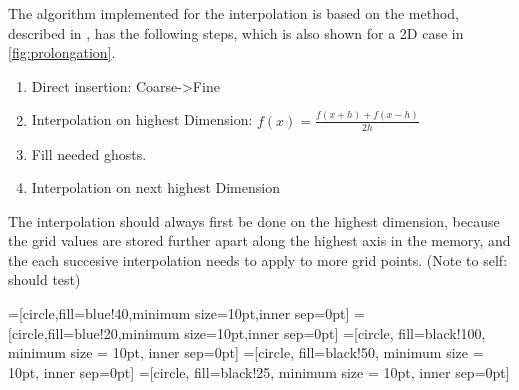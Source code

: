 	The algorithm implemented for the interpolation is based on the method, described in
	\cite{??}, has the following steps, which is also shown for a 2D case in \ref{fig:prolongation}.

 	\begin{enumerate}
		\item Direct insertion: Coarse->Fine
		\item Interpolation on highest Dimension: \(f(x) = \frac{f(x+h) + f(x-h)}{2h}\)
		\item Fill needed ghosts.
		\item Interpolation on next highest Dimension
	\end{enumerate}

	The interpolation should always first be done on the highest dimension, because the grid values are stored further
	apart along the highest axis in the memory, and the each succesive interpolation needs to apply to more grid points. (Note to self: should test)

	=[circle,fill=blue!40,minimum size=10pt,inner sep=0pt]
	=[circle,fill=blue!20,minimum size=10pt,inner sep=0pt]
	=[circle, fill=black!100, minimum size = 10pt, inner sep=0pt]
	=[circle, fill=black!50, minimum size = 10pt, inner sep=0pt]
	=[circle, fill=black!25, minimum size = 10pt, inner sep=0pt]


